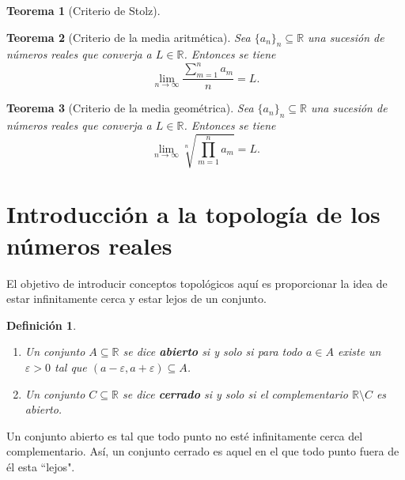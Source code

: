\documentclass{article}
\newtheorem{theorem}{Teorema}
\newtheorem{define}{Definición}
\newcommand{\reales}{\mathbb{R}}
\newcommand{\sucreal}[1]{\{ #1 _n \}_n \subseteq \reales}
\begin{document}
\begin{theorem}[Criterio de Stolz]

\end{theorem}

\begin{theorem}[Criterio de la media aritmética]
	Sea $\sucreal{a}$ una sucesión de números reales que converja a $L \in \reales$. Entonces se tiene
	\begin{equation*}
		 \lim_{n \rightarrow \infty} \frac{\sum_{m=1}^{n} a_m}{n} = L.
	\end{equation*}
\end{theorem}

\begin{theorem}[Criterio de la media geométrica]
	Sea $\sucreal{a}$ una sucesión de números reales que converja a $L \in \reales$. Entonces se tiene
	\begin{equation*}
		 \lim_{n \rightarrow \infty} \sqrt[n]{\prod_{m=1}^{n} a_m} = L.
	\end{equation*}
\end{theorem}














\newpage
\section{Introducción a la topología de los números reales}

El objetivo de introducir conceptos topológicos aquí es proporcionar la idea de estar infinitamente cerca y estar lejos de un conjunto.

\begin{define}
\begin{enumerate}
	\item
	Un conjunto $A \subseteq \reales$ se dice \textbf{abierto} si y solo si para todo $a \in A$ existe un $\varepsilon > 0$ tal que $(a - \varepsilon, a + \varepsilon) \subseteq A$.
	\item 
	Un conjunto $C \subseteq \reales$ se dice \textbf{cerrado} si y solo si el complementario $\reales \setminus C$ es abierto.
\end{enumerate}
\end{define}

Un conjunto abierto es tal que todo punto no esté infinitamente cerca del complementario. Así, un conjunto cerrado es aquel en el que todo punto fuera de él esta ``lejos".
\end{document}

